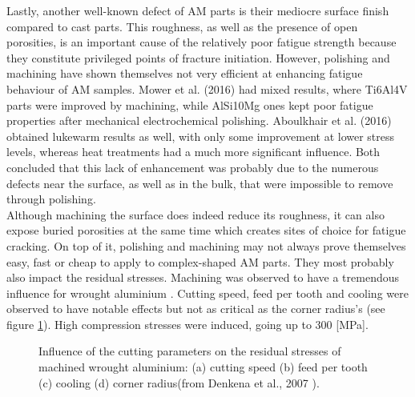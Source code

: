 Lastly, another well-known defect of AM parts is their mediocre surface finish compared to cast parts. This roughness, as well as the presence of open porosities, is an important cause of the relatively poor fatigue strength because they constitute privileged points of fracture initiation. However, polishing and machining have shown themselves not very efficient at enhancing fatigue behaviour of AM samples. Mower et al. (2016)\cite{MOWER2016198} had mixed results, where Ti6Al4V parts were improved by machining, while AlSi10Mg ones kept poor fatigue properties after mechanical electrochemical polishing. Aboulkhair et al. (2016) \cite{ABOULKHAIR2016bis} obtained lukewarm results as well, with only some improvement at lower stress levels, whereas heat treatments had a much more significant influence. Both concluded that this lack of enhancement was probably due to the numerous defects near the surface, as well as in the bulk, that were impossible to remove through polishing. \\

Although machining the surface does indeed reduce its roughness, it can also expose buried porosities at the same time which creates sites of choice for fatigue cracking. On top of it, polishing and machining may not always prove themselves easy, fast or cheap to apply to complex-shaped AM parts. They most probably also impact the residual stresses. Machining was observed to have a tremendous influence for wrought aluminium \parencite{Denkena2007}. Cutting speed, feed per tooth and cooling were observed to have notable effects but not as critical as the corner radius's (see figure \ref{fig:Mach}). High compression stresses were induced, going up to 300 [MPa].\\

\begin{figure}[ht]
	\centering
	\noindent{}
	\decoRule
	\caption[Influence of the cutting parameters on the residual stresses of machined wrought aluminium: (a) cutting speed (b) feed per tooth (c) cooling (d) corner radius.]{Influence of the cutting parameters on the residual stresses of machined wrought aluminium: (a) cutting speed (b) feed per tooth (c) cooling (d) corner radius(from Denkena et al., 2007 \parencite{Denkena2007}).}
	\label{fig:Mach}
\end{figure}

